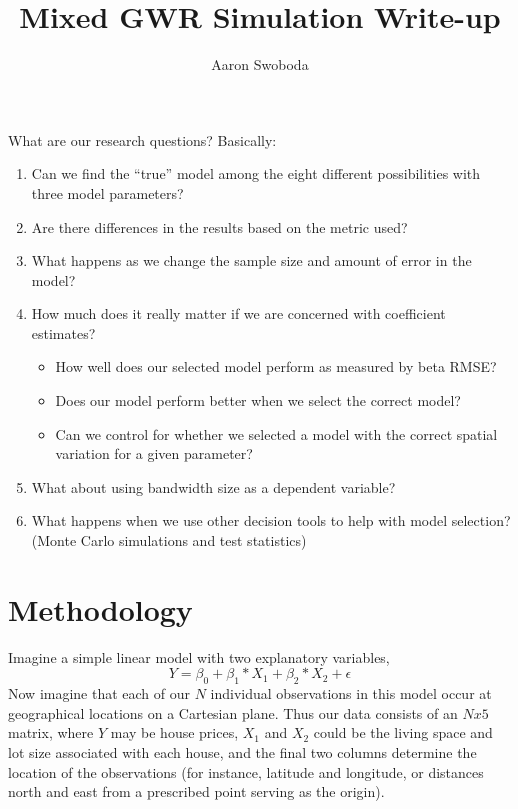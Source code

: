 \documentclass{article}\usepackage[]{graphicx}\usepackage[]{color}
\title{Mixed GWR Simulation Write-up}
\author{Aaron Swoboda}
\begin{document}
\maketitle

What are our research questions? Basically:
\begin{enumerate}
\item Can we find the ``true'' model among the eight different possibilities with three model parameters?
\item Are there differences in the results based on the metric used?
\item What happens as we change the sample size and amount of error in the model?
\item How much does it really matter if we are concerned with coefficient estimates?
  \begin{itemize}
  \item How well does our selected model perform as measured by beta RMSE?
  \item Does our model perform better when we select the correct model?
  \item Can we control for whether we selected a model with the correct spatial variation for a given parameter?
  \end{itemize}
\item What about using bandwidth size as a dependent variable?
\item What happens when we use other decision tools to help with model selection? (Monte Carlo simulations and test statistics)
\end{enumerate}





\section{Methodology}

Imagine a simple linear model with two explanatory variables,
\begin{equation}
Y = \beta _0 + \beta _1 *X_1 + \beta _2 * X_2 + \epsilon
\end{equation}
Now imagine that each of our $N$ individual observations in this model occur at geographical locations on a Cartesian plane. Thus our data consists of an $N x 5$ matrix, where $Y$ may be house prices, $X_1$ and $X_2$ could be the living space and lot size associated with each house, and the final two columns determine the location of the observations (for instance, latitude and longitude, or distances north and east from a prescribed point serving as the origin).
\end{document}
